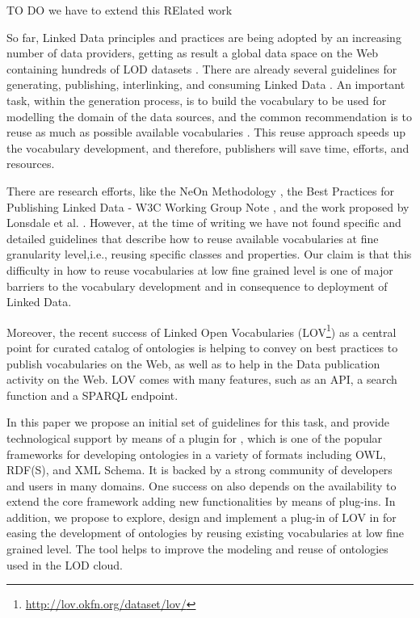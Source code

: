 TO DO we have to extend this RElated work

So far, Linked Data principles and practices are being adopted by an increasing number of data providers, getting as result a global data space on the Web containing hundreds of LOD datasets \cite{Heath_Bizer_2011}. There are already several guidelines for generating, publishing, interlinking, and consuming Linked Data \cite{Heath_Bizer_2011}. An important task, within the generation process, is to build the vocabulary to be used for modelling the domain of the data sources, and the common recommendation is to reuse as much as possible available vocabularies \cite{Heath_Bizer_2011,hyland14}. This reuse approach speeds up the vocabulary development, and therefore, publishers will save time, efforts, and resources. 

There are research efforts, like the NeOn Methodology \cite{suarezfigueroa2012ontology}, the Best Practices for Publishing Linked Data - W3C Working Group Note \cite{hyland14}, and the work proposed by Lonsdale et al. \cite{Lonsdale2010318}. However, at the time of writing we have not found specific and detailed guidelines that describe how to reuse available vocabularies at fine granularity level,i.e., reusing specific classes and properties. Our claim is that this difficulty in how to reuse vocabularies at low fine grained level is one of major barriers to the vocabulary development and in consequence to deployment of Linked Data.

Moreover, the recent success of Linked Open Vocabularies (LOV\footnote{\url{http://lov.okfn.org/dataset/lov/}}) as a central point for curated catalog of ontologies is helping to convey on best practices to publish vocabularies on the Web, as well as to help in the Data publication activity on the Web. LOV comes with many features, such as an API, a search function and a SPARQL endpoint.

In this paper we propose an initial set of guidelines for this task, and provide technological support by means of a plugin for \protege, which is one of the popular frameworks for developing ontologies in a variety of formats including OWL, RDF(S), and XML Schema. It is backed by a strong community of developers and users in many domains. One success on \protege also depends on the availability to extend the core framework adding new functionalities by means of plug-ins. In addition, we propose to explore, design and implement a plug-in of LOV in \protege for easing the development of ontologies by reusing existing vocabularies at low fine grained level. The tool helps to improve the modeling and reuse of ontologies used in the LOD cloud.

